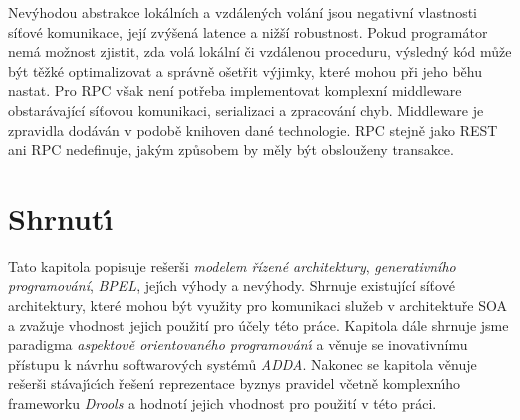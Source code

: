 
Nevýhodou abstrakce lokálních a vzdálených volání jsou
negativní vlastnosti síťové komunikace, její zvýšená latence
a nižší robustnost. Pokud programátor nemá možnost zjistit, zda volá
lokální či vzdálenou proceduru, výsledný kód může být těžké optimalizovat
a správně ošetřit výjimky, které mohou při jeho běhu nastat.
Pro \gls{RPC} však není potřeba implementovat komplexní middleware obstarávající
síťovou komunikaci, serializaci a zpracování chyb. Middleware je zpravidla dodáván v
podobě knihoven dané technologie. \gls{RPC} stejně jako \gls{REST}
ani \gls{RPC} nedefinuje, jakým způsobem by měly být obslouženy transakce.

\section{Shrnut\'{\i}}

Tato kapitola popisuje rešerši \textit{modelem řízené architektury},
\textit{generativního programování}, \textit{BPEL},
jej\'{\i}ch v\'yhody a nev\'yhody. Shrnuje existující síťové architektury,
které mohou být využity pro komunikaci služeb v architektuře \gls{SOA}
a zvažuje vhodnost jejich použití pro účely této práce.
Kapitola dále shrnuje jsme paradigma \textit{aspektově orientovaného programován\'{\i}} a
věnuje se inovativnímu přístupu k návrhu softwarov\'ych systémů \textit{ADDA}.
Nakonec se kapitola věnuje rešerši stávaj\'{\i}c\'{\i}ch řešen\'{\i} reprezentace byznys pravidel
včetně komplexn\'{\i}ho frameworku \textit{Drools} a hodnotí jejich vhodnost pro použití v této práci.
